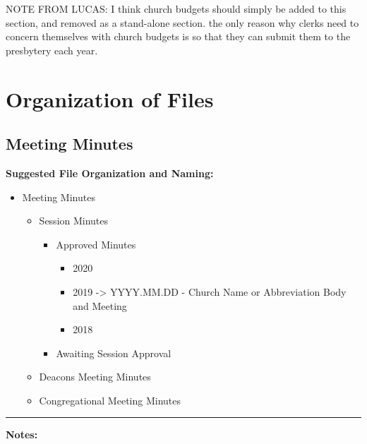 \documentclass[
]{book}
\providecommand{\tightlist}{%
  \setlength{\itemsep}{0pt}\setlength{\parskip}{0pt}}
\begin{document}
NOTE FROM LUCAS: I think church budgets should simply be added to this section, and removed as a stand-alone section. the only reason why clerks need to concern themselves with church budgets is so that they can submit them to the presbytery each year.

\hypertarget{organization-of-files}{%
\chapter{Organization of Files}\label{organization-of-files}}

\hypertarget{meeting-minutes}{%
\section{Meeting Minutes}\label{meeting-minutes}}

\textbf{Suggested File Organization and Naming:}

\begin{itemize}
\tightlist
\item
  Meeting Minutes

  \begin{itemize}
  \tightlist
  \item
    Session Minutes

    \begin{itemize}
    \tightlist
    \item
      Approved Minutes

      \begin{itemize}
      \tightlist
      \item
        2020
      \item
        2019 -\textgreater{} YYYY.MM.DD - Church Name or Abbreviation \textbar{} Body and Meeting
      \item
        2018
      \end{itemize}
    \item
      Awaiting Session Approval
    \end{itemize}
  \item
    Deacons Meeting Minutes
  \item
    Congregational Meeting Minutes
  \end{itemize}
\end{itemize}

\begin{center}\rule{0.5\linewidth}{0.5pt}\end{center}

\textbf{Notes:}
\end{document}
